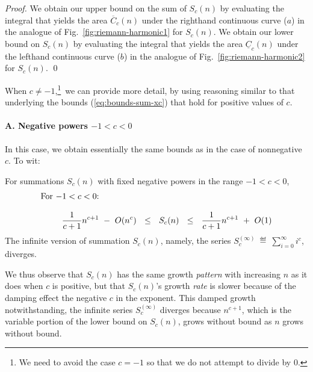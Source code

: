 \begin{proof}
We obtain our upper bound on the sum of $S_c(n)$ by evaluating the integral that yields the area $\overline{C}_c(n)$ under the righthand continuous curve ($a$) in the analogue of Fig.~\ref{fig:riemann-harmonic1} for $S_c(n)$.  We obtain our lower bound on $S_c(n)$ by evaluating the integral that yields the area $\underline{C}_c(n)$ under the lefthand continuous curve ($b$) in the analogue of Fig.~\ref{fig:riemann-harmonic2} for $S_c(n)$.  \qed
\end{proof}

When $c \neq -1$,\footnote{We need to avoid the case $c = -1$ so that we do not attempt to divide by $0$.}~we can provide more detail, by using reasoning similar to that underlying the bounds (\ref{eq:bounds-sum-xc}) that hold for positive values of $c$.

\paragraph{A. Negative powers $-1 < c < 0$}

In this case, we obtain essentially the same bounds as in the case of nonnegative $c$.  To wit:

\begin{prop}
\label{thm:bounds-(-1)<c<0}
For summations $S_c(n)$ with fixed negative powers in the range $-1 < c<0$,
\begin{equation}
\label{eq:bounds-(-1)<c<0}
\begin{array}{l}
\mbox{For $-1 < c< 0$:} \\
 \\
\hspace*{.35in}
{\displaystyle \frac{1}{c+1} n^{c+1} \ - \ O(n^c)}
  \ \ \leq \ \ S_c(n)
  \ \ \leq \ \
{\displaystyle \frac{1}{c+1} n^{c+1} \ + \ O(1)}
\end{array}
\end{equation}
The infinite version of summation $S_c(n)$, namely, the series
$\displaystyle S_c^{(\infty)} \ \eqdef \ \sum_{i=0}^\infty i^c$,
diverges.
\end{prop}

We thus observe that $S_c(n)$ has the same growth {\em pattern} with increasing $n$ as it does when $c$ is positive, but that $S_c(n)$'s growth {\em rate} is slower because of the damping effect the negative $c$ in the exponent.  This damped growth notwithstanding, the infinite series $S_c^{(\infty)}$ diverges because $n^{c+1}$, which is the variable portion of the lower bound on $S_c(n)$, grows without bound as $n$ grows without bound.


